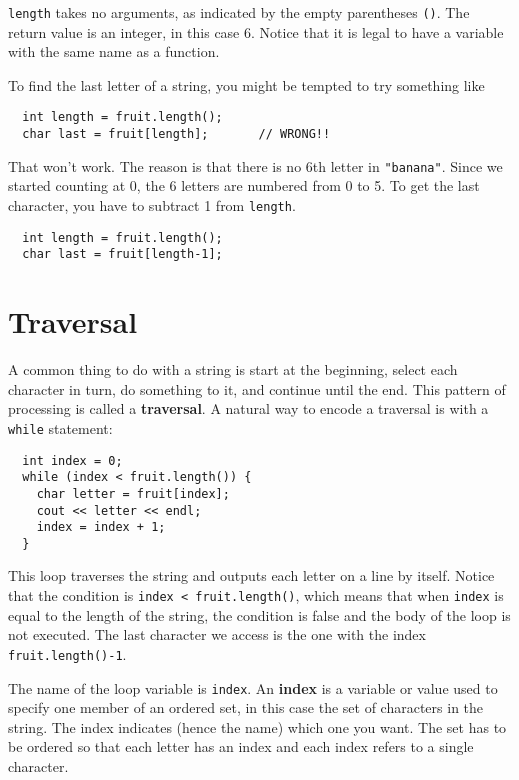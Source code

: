 {\tt length} takes no arguments, as indicated by the empty parentheses
{\tt ()}.  The return value is an integer, in this case 6.  Notice
that it is legal to have a variable with the same name as a function.

To find the last letter of a string, you might be tempted to
try something like

\begin{lstlisting}
  int length = fruit.length();
  char last = fruit[length];       // WRONG!!
\end{lstlisting}
%
That won't work.  The reason is that there is no 6th letter
in {\tt "banana"}.  Since we started counting at 0, the 6
letters are numbered from 0 to 5.  To get the last character,
you have to subtract 1 from {\tt length}.

\begin{lstlisting}
  int length = fruit.length();
  char last = fruit[length-1];
\end{lstlisting}

\section{Traversal}

A common thing to do with a string is
start at the beginning, select each character in turn, do
something to it, and continue until the end.  This pattern
of processing is called a {\bf traversal}.  A natural
way to encode a traversal is with a {\tt while} statement:

\begin{lstlisting}
  int index = 0;
  while (index < fruit.length()) {
    char letter = fruit[index];
    cout << letter << endl;
    index = index + 1;
  }
\end{lstlisting}
%
This loop traverses the string and outputs each letter on
a line by itself.  Notice that the condition is
{\tt index < fruit.length()}, which means that when
{\tt index} is equal to the length of the string, the
condition is false and the body of the loop is not executed.
The last character we access is the one with the
index {\tt fruit.length()-1}.


The name of the loop variable is {\tt index}.  An {\bf
index} is a variable or value used to specify one member of an ordered
set, in this case the set of characters in the string.  The index
indicates (hence the name) which one you want.  The set has to be
ordered so that each letter has an index and each index
refers to a single character.

